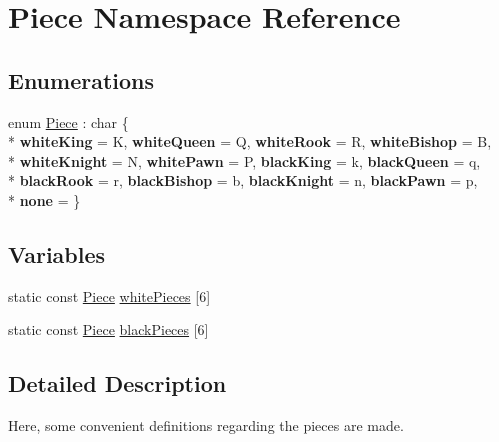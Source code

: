 \hypertarget{namespacePiece}{}\section{Piece Namespace Reference}
\label{namespacePiece}
\subsection*{Enumerations}
\begin{DoxyCompactItemize}
\item 
enum \hyperlink{namespacePiece_a588233307aa6bdb32c1d62c9f20895cc}{Piece} \+: char \{ \\*
{\bfseries white\+King} = \textquotesingle{}K\textquotesingle{}, 
{\bfseries white\+Queen} = \textquotesingle{}Q\textquotesingle{}, 
{\bfseries white\+Rook} = \textquotesingle{}R\textquotesingle{}, 
{\bfseries white\+Bishop} = \textquotesingle{}B\textquotesingle{}, 
\\*
{\bfseries white\+Knight} = \textquotesingle{}N\textquotesingle{}, 
{\bfseries white\+Pawn} = \textquotesingle{}P\textquotesingle{}, 
{\bfseries black\+King} = \textquotesingle{}k\textquotesingle{}, 
{\bfseries black\+Queen} = \textquotesingle{}q\textquotesingle{}, 
\\*
{\bfseries black\+Rook} = \textquotesingle{}r\textquotesingle{}, 
{\bfseries black\+Bishop} = \textquotesingle{}b\textquotesingle{}, 
{\bfseries black\+Knight} = \textquotesingle{}n\textquotesingle{}, 
{\bfseries black\+Pawn} = \textquotesingle{}p\textquotesingle{}, 
\\*
{\bfseries none} = \textquotesingle{} \textquotesingle{}
 \}
\end{DoxyCompactItemize}
\subsection*{Variables}
\begin{DoxyCompactItemize}
\item 
static const \hyperlink{namespacePiece_a588233307aa6bdb32c1d62c9f20895cc}{Piece} \hyperlink{namespacePiece_a8c9ba77d6f9a9bb67a5a5d8e95a9f945}{white\+Pieces} \mbox{[}6\mbox{]}
\item 
static const \hyperlink{namespacePiece_a588233307aa6bdb32c1d62c9f20895cc}{Piece} \hyperlink{namespacePiece_a531c90c92acec2708048ce3b9caddf2a}{black\+Pieces} \mbox{[}6\mbox{]}
\end{DoxyCompactItemize}


\subsection{Detailed Description}
Here, some convenient definitions regarding the pieces are made. 

